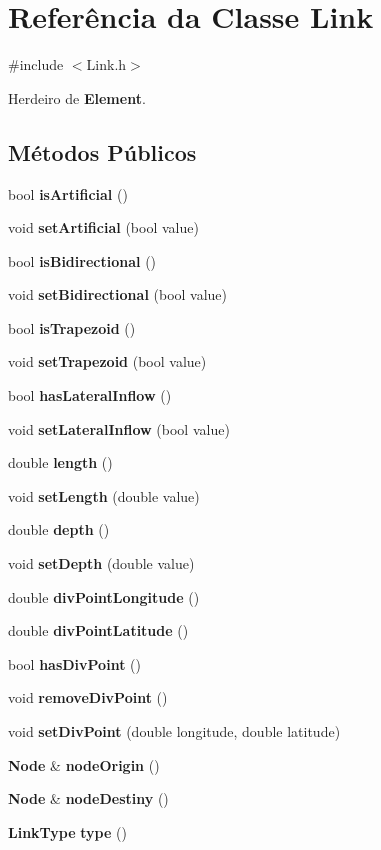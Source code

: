 \section{Referência da Classe Link}
\label{class_link}


{\ttfamily \#include $<$Link.\+h$>$}



Herdeiro de {\bf Element}.

\subsection*{Métodos Públicos}
\begin{DoxyCompactItemize}
\item 
bool {\bf is\+Artificial} ()
\item 
void {\bf set\+Artificial} (bool value)
\item 
bool {\bf is\+Bidirectional} ()
\item 
void {\bf set\+Bidirectional} (bool value)
\item 
bool {\bf is\+Trapezoid} ()
\item 
void {\bf set\+Trapezoid} (bool value)
\item 
bool {\bf has\+Lateral\+Inflow} ()
\item 
void {\bf set\+Lateral\+Inflow} (bool value)
\item 
double {\bf length} ()
\item 
void {\bf set\+Length} (double value)
\item 
double {\bf depth} ()
\item 
void {\bf set\+Depth} (double value)
\item 
double {\bf div\+Point\+Longitude} ()
\item 
double {\bf div\+Point\+Latitude} ()
\item 
bool {\bf has\+Div\+Point} ()
\item 
void {\bf remove\+Div\+Point} ()
\item 
void {\bf set\+Div\+Point} (double longitude, double latitude)
\item 
{\bf Node} \& {\bf node\+Origin} ()
\item 
{\bf Node} \& {\bf node\+Destiny} ()
\item 
{\bf Link\+Type} {\bf type} ()
\end{DoxyCompactItemize}
